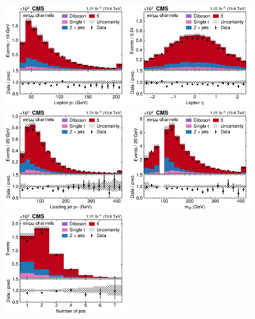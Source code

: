 \begin{figure}[!hp]
\centering
\includegraphics[width=0.49\textwidth]{figures/ttxs/lep_pt_eemm.pdf}
\hfill
\includegraphics[width=0.49\textwidth]{figures/ttxs/lep_eta_eemm.pdf}
\includegraphics[width=0.49\textwidth]{figures/ttxs/1st_jet_pt_eemm.pdf}
\hfill
\includegraphics[width=0.49\textwidth]{figures/ttxs/mll_eemm.pdf}
\includegraphics[width=0.49\textwidth]{figures/ttxs/njet_eemm.pdf}

\end{figure}
